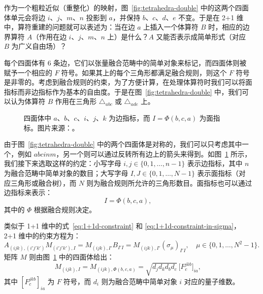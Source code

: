 作为一个粗粒近似（重整化）的映射，图~\ref{fig:tetrahedra-double} 中的这两个四面体单元会将边 $i$、$j$、$m$、$n$ 投影到 $a$，并保持 $b$、$c$、$d$、$e$ 不变。于是在 2+1 维中，算符重建的问题就可以表述为：当在边 $a$ 上插入一个体算符 $B$ 时，相应的边界算符 $A$（作用在边 $i$、$j$、$m$、$n$ 上）是什么？$A$ 又能否表示成简单形式（对应 $B$ 为广义自由场）？

每个四面体有 6 条边，它们以张量融合范畴中的简单对象来标记，而四面体则被赋予一个相应的 $F$ 符号。如果其上的每个三角形都满足融合规则，则这个 $F$ 符号是非零的。考虑到融合规则的约束，为了方便计算，在处理体算符时我们可以将面指标而非边指标作为基本的自由度。于是在图~\ref{fig:tetrahedra-double} 中，我们可以认为体算符 $B$ 作用在三角形 $\triangle_{abc}$ 或 $\triangle_{ade}$ 上。

\begin{figure}[htb]
  \centering
  \caption[四面体中的边指标与面指标]{四面体中 $a$、$b$、$c$、$i$、$j$、$k$ 为边指标，而 $I=\Phi(b,c,a)$ 为面指标。图片来源：\parencite{zeng2023bulk}。}
  \label{fig:tetrahedra-single}
\end{figure}

由于图~\ref{fig:tetrahedra-double} 中的两个四面体是对称的，我们可以只考虑其中一个，例如 $abcinm$，另一个则可以通过反转所有边上的箭头来得到。如图~\ref{fig:tetrahedra-single} 所示，我们接下来选取这样的约定：小写字母 $i,j\in\{0,1,\dots,n-1\}$ 表示边指标，其中 $n$ 为融合范畴中简单对象的数目；大写字母 $I, J\in \{0,1,\dots,N-1\}$ 表示面指标（对应三角形或融合树），而 $N$ 则为融合规则所允许的三角形数目。面指标也可以通过边指标来表示：
\begin{equation}
  I = \Phi(b,c,a),
\end{equation}
其中的 $\Phi$ 根据融合规则决定。

类似于 1+1 维中的式~\eqref{eq:1+1d-constraint} 和 \eqref{eq:1+1d-constraint-in-sigma}，2+1 维中的约束方程为：
\begin{equation}
    A_{(ijk), (i'j'k')} M_{(i'j'k'), I}
  = M_{(ijk), I'} B_{I'I}
  = M_{(ijk), I'} (\sigma_\mu)_{I'I}, \quad \mu \in\{ 0,1,\dots,N^2-1 \}.
\end{equation}
矩阵 $M$ 则由图~\ref{fig:tetrahedra-single} 中的四面体给出：
\begin{equation}
  M_{(ijk), I} = M_{(ijk), \Phi(b,c,a)} = \sqrt{d_j d_k d_b d_c} \, \bigl[ F^{jkb}_c \bigr]_{ia},
\end{equation}
其中 $[F^{jkb}_c]_{ia}$ 为 $F$ 符号，而 $d_i$ 则为融合范畴中简单对象 $i$ 对应的量子维数。

